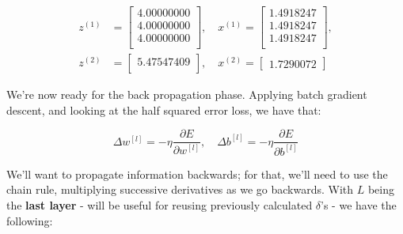 \documentclass[12pt]{article}
\begin{document}
\begin{enumerate}[leftmargin=\labelsep]
        \begin{equation*}
          \begin{aligned}
            z^{(1)} & = \begin{bmatrix}
                          4.00000000 \\
                          4.00000000 \\
                          4.00000000 \\
                        \end{bmatrix}, \quad
            x^{(1)} = \begin{bmatrix}
                        1.4918247 \\
                        1.4918247 \\
                        1.4918247 \\
                      \end{bmatrix},         \\
            z^{(2)} & = \begin{bmatrix}
              5.47547409\\
            \end{bmatrix}, \quad
            x^{(2)} = \begin{bmatrix}
                        1.7290072
                      \end{bmatrix}
          \end{aligned}
        \end{equation*}

        We're now ready for the back propagation phase. Applying batch gradient descent,
        and looking at the half squared error loss, we have that:

        \begin{equation*}
          \Delta w^{[l]} = - \eta \frac{\partial E}{\partial w^{[l]}}, \quad
          \Delta b^{[l]} = - \eta \frac{\partial E}{\partial b^{[l]}}
        \end{equation*}

        We'll want to propagate information backwards; for that, we'll need to use
        the chain rule, multiplying successive derivatives as we go backwards.
        With $L$ being the \textbf{last layer} - will be useful for reusing previously
        calculated $\delta$'s - we have the following:


\end{enumerate}
\end{document}
